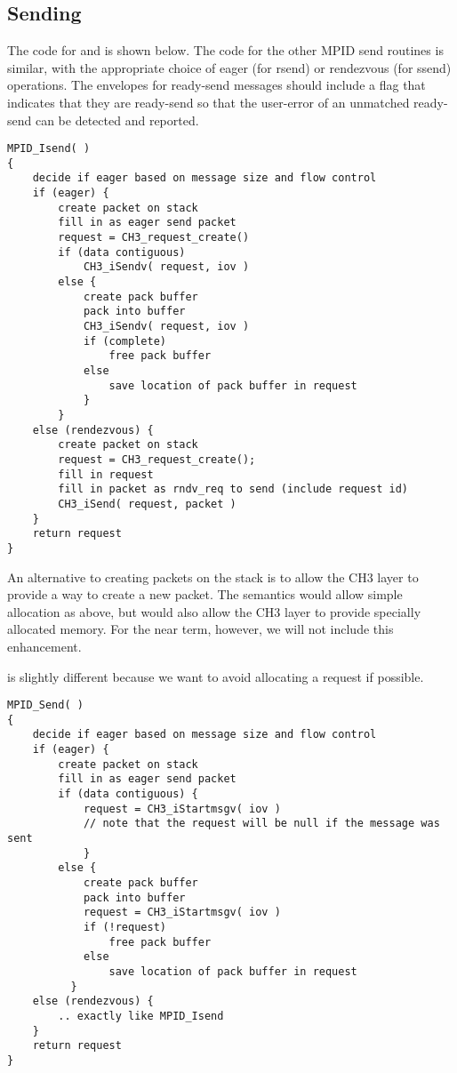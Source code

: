 \documentclass{article}
\begin{document}
\subsection{Sending}
The code for  and  is shown below.  The code
for the other 
MPID send routines is similar, with the appropriate choice of eager
(for rsend) or rendezvous (for ssend) operations.  
The envelopes for ready-send messages should include
a flag that indicates that they are ready-send so that the user-error of an
unmatched ready-send can be detected and reported.

\begin{verbatim}
MPID_Isend( )
{
    decide if eager based on message size and flow control
    if (eager) {
        create packet on stack
        fill in as eager send packet
        request = CH3_request_create()
        if (data contiguous)
            CH3_iSendv( request, iov )
        else {
            create pack buffer
            pack into buffer
            CH3_iSendv( request, iov )
            if (complete)
                free pack buffer
            else
                save location of pack buffer in request
            }
        }
    else (rendezvous) {
        create packet on stack
        request = CH3_request_create();
        fill in request
        fill in packet as rndv_req to send (include request id)
        CH3_iSend( request, packet )
    } 
    return request
}
\end{verbatim}

An alternative to creating packets on the stack is to allow the CH3 layer to
provide a way to create a new packet. The semantics would allow simple
allocation as above, but would also allow the CH3 layer to provide specially
allocated memory.  For the near term, however, we will not include this
enhancement. 

 is slightly different because we want to avoid allocating a
request if possible.  

\begin{verbatim}
MPID_Send( )
{
    decide if eager based on message size and flow control
    if (eager) {
        create packet on stack
        fill in as eager send packet
        if (data contiguous) {
            request = CH3_iStartmsgv( iov )
            // note that the request will be null if the message was sent
            }
        else {
            create pack buffer
            pack into buffer
            request = CH3_iStartmsgv( iov )
            if (!request)
                free pack buffer
            else
                save location of pack buffer in request
          }
    else (rendezvous) {
        .. exactly like MPID_Isend
    } 
    return request
}
\end{verbatim}
\end{document}
